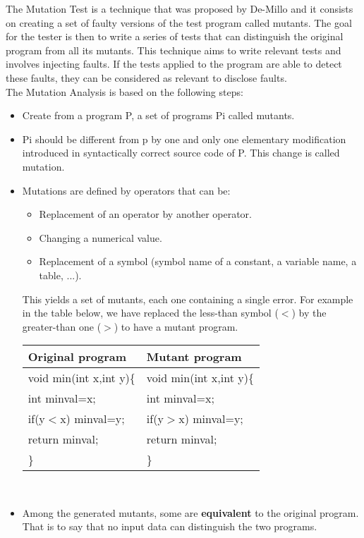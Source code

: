 \documentclass{acm_proc_article-sp}
\begin{document}
The Mutation Test \cite{yve:pas:hel} is a technique that was proposed by De-Millo and it  consists on creating a set of faulty versions of the test program called mutants. The goal for the tester is then to write a series of tests that can distinguish the original program from all its mutants. This technique aims to write relevant tests and involves injecting faults. If the tests applied to the program are able to detect these faults, they can be considered as relevant to disclose faults.\\
The Mutation Analysis is based on the following steps:
\begin{itemize}
 \item Create from a program P, a set of programs Pi called mutants.
 \item Pi should be different from p by one and only one elementary modification introduced in syntactically correct source code of P. This change is called mutation.
 \item Mutations are defined by operators that can be:
 \begin{itemize}
  \item Replacement of an operator by another operator.
  \item Changing a numerical value.
  \item Replacement of a symbol (symbol name of a constant, a variable name, a table, ...).\\
 \end{itemize}
 This yields a set of mutants, each one containing a single error. For example in the table below, we have replaced the less-than symbol ($<$) by the greater-than one ($>$) to have a mutant program. \\
\begin{center}
\begin{tabular}{|l|l|}
\hline Original program & Mutant program \\
\hline void min(int x,int y)\{ & void min(int x,int y)\{\\
               int minval=x; &   int minval=x; \\
        if(y$<$x) minval=y;  &  if(y$>$x) minval=y;\\
        return minval;  &  return minval;\\
       \} & \}\\ \hline
\end{tabular} \vspace{0.3cm} \\
\end{center}
 \item Among the generated mutants, some are \textbf{equivalent} to the original program. That is to say that no input data can distinguish the two programs.\\

\end{itemize}
\end{document}

